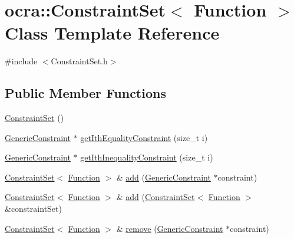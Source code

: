 \hypertarget{classocra_1_1ConstraintSet_3_01Function_01_4}{}\section{ocra\+:\+:Constraint\+Set$<$ Function $>$ Class Template Reference}
\label{classocra_1_1ConstraintSet_3_01Function_01_4}


{\ttfamily \#include $<$Constraint\+Set.\+h$>$}

\subsection*{Public Member Functions}
\begin{DoxyCompactItemize}
\item 
\hyperlink{classocra_1_1ConstraintSet_3_01Function_01_4_ac79927faf3e3f795670ab85025b1e4a4}{Constraint\+Set} ()
\item 
\hyperlink{namespaceocra_af10341108ce661566aad00908668e2b1}{Generic\+Constraint} $\ast$ \hyperlink{classocra_1_1ConstraintSet_3_01Function_01_4_a376c4fe9b26afe70f176c2913fb870f0}{get\+Ith\+Equality\+Constraint} (size\+\_\+t i)
\item 
\hyperlink{namespaceocra_af10341108ce661566aad00908668e2b1}{Generic\+Constraint} $\ast$ \hyperlink{classocra_1_1ConstraintSet_3_01Function_01_4_ae105fbee1e6f91fd6b2f8657b72d2511}{get\+Ith\+Inequality\+Constraint} (size\+\_\+t i)
\item 
\hyperlink{classocra_1_1ConstraintSet}{Constraint\+Set}$<$ \hyperlink{classocra_1_1Function}{Function} $>$ \& \hyperlink{classocra_1_1ConstraintSet_3_01Function_01_4_a6a52d3b1aa1a8c30f6adbda59894e852}{add} (\hyperlink{namespaceocra_af10341108ce661566aad00908668e2b1}{Generic\+Constraint} $\ast$constraint)
\item 
\hyperlink{classocra_1_1ConstraintSet}{Constraint\+Set}$<$ \hyperlink{classocra_1_1Function}{Function} $>$ \& \hyperlink{classocra_1_1ConstraintSet_3_01Function_01_4_ae7914b97dc71ef0604e5f853dbe14162}{add} (\hyperlink{classocra_1_1ConstraintSet}{Constraint\+Set}$<$ \hyperlink{classocra_1_1Function}{Function} $>$ \&constraint\+Set)
\item 
\hyperlink{classocra_1_1ConstraintSet}{Constraint\+Set}$<$ \hyperlink{classocra_1_1Function}{Function} $>$ \& \hyperlink{classocra_1_1ConstraintSet_3_01Function_01_4_ab063f89bb8d35ae717a9d3dd7abe4582}{remove} (\hyperlink{namespaceocra_af10341108ce661566aad00908668e2b1}{Generic\+Constraint} $\ast$constraint)

\end{DoxyCompactItemize}
